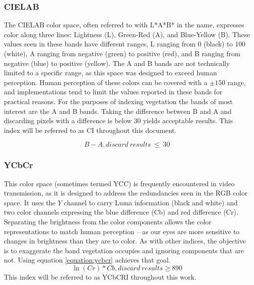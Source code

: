 \documentclass[letterpaper]{report}
\begin{document}
{\subsubsection{CIELAB}
The CIELAB color space, often referred to with L*A*B* in the name, expresses color along three lines: Lightness (L), Green-Red (A), and Blue-Yellow (B). These values seen in these bands have different ranges, L ranging from 0 (black) to 100 (white), A ranging from negative (green) to positive (red), and B ranging from negative (blue) to positive (yellow). The A and B bands are not technically limited to a specific range, as this space was designed to exceed human perception. Human perception of these colors can be covered with a $\pm 150$ range, and implementations tend to limit the values reported in these bands for practical reasons.  For the purposes of indexing vegetation the bands of  most interest are the A and B bands. Taking the difference between B and A and discarding pixels with a difference is below 30 yields acceptable results. This index will be referred to as CI throughout this document.

\begin{equation}
		\label{equation:cielab}
		B - A, discard~results~\leq~30
\end{equation}

\subsubsection{YCbCr}
This color space (sometimes termed YCC) is frequently encountered in video transmission, as it is designed to address the redundancies seen in the RGB color space. It uses the $Y$ channel to carry Luma information (black and white) and two color channels expressing the blue difference (Cb) and red difference (Cr). Separating the brightness from the color components allows the color representations to match human perception -- as our eyes are more sensitive to changes in brightness than they are to color. As with other indices, the objective is to exaggerate the band vegetation occupies and ignoring components that are not. Using equation \ref{equation:ycbcr} achieves that goal.
\begin{equation}
	\label{equation:ycbcr}
	\ln(Cr) * Cb, discard\ results\geq 890
\end{equation}
This index will be referred to as YCbCRI throughout this work.

}
\end{document}
